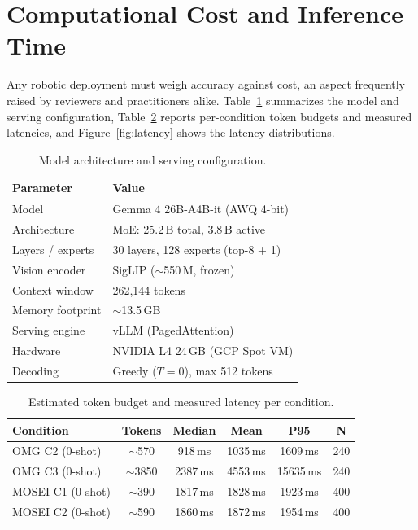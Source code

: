 \documentclass[conference]{IEEEtran}
\begin{document}
\section{Computational Cost and Inference Time}
\label{sec:cost}
Any robotic deployment must weigh accuracy against cost, an aspect frequently raised by reviewers and practitioners alike. Table~\ref{tab:model} summarizes the model and serving configuration, Table~\ref{tab:latency} reports per-condition token budgets and measured latencies, and Figure~\ref{fig:latency} shows the latency distributions.

\begin{table}[htbp]
\caption{Model architecture and serving configuration.}
\label{tab:model}
\centering
\setlength{\tabcolsep}{4pt}
\renewcommand{\arraystretch}{1.15}
\small
\begin{tabular}{l l}
\hline
\textbf{Parameter} & \textbf{Value} \\
\hline
Model & Gemma 4 26B-A4B-it (AWQ 4-bit) \\
Architecture & MoE: 25.2\,B total, 3.8\,B active \\
Layers / experts & 30 layers, 128 experts (top-8 + 1) \\
Vision encoder & SigLIP ($\sim$550\,M, frozen) \\
Context window & 262{,}144 tokens \\
Memory footprint & $\sim$13.5\,GB \\
Serving engine & vLLM (PagedAttention) \\
Hardware & NVIDIA L4 24\,GB (GCP Spot VM) \\
Decoding & Greedy ($T=0$), max 512 tokens \\
\hline
\end{tabular}
\end{table}

\begin{table}[htbp]
\caption{Estimated token budget and measured latency per condition.}
\label{tab:latency}
\centering
\setlength{\tabcolsep}{3pt}
\renewcommand{\arraystretch}{1.15}
\footnotesize
\begin{tabular}{l c c c c c}
\hline
\textbf{Condition} & \textbf{Tokens} & \textbf{Median} & \textbf{Mean} & \textbf{P95} & \textbf{N} \\
\hline
OMG C2 (0-shot) & $\sim$570 & 918\,ms & 1035\,ms & 1609\,ms & 240 \\
OMG C3 (0-shot) & $\sim$3850 & 2387\,ms & 4553\,ms & 15635\,ms & 240 \\
MOSEI C1 (0-shot) & $\sim$390 & 1817\,ms & 1828\,ms & 1923\,ms & 400 \\
MOSEI C2 (0-shot) & $\sim$590 & 1860\,ms & 1872\,ms & 1954\,ms & 400 \\
\hline
\end{tabular}
\end{table}
\end{document}
